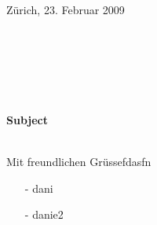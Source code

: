 \documentclass[a4paper,12pt]{letter}
\begin{document}
\renewcommand{\headrulewidth}{0pt}

\hspace{90mm}Zürich, 23. Februar 2009
\\\par\hspace{88mm}
\usebox{\areturn}\\
\hspace{90mm}\parbox[t][20mm]{50mm}{\hspace{90mm}\fromName \\ \fromStreet \\ \fromPlace \\ \fromTel } 
\vspace{20mm}
\par 
\textbf{Subject} \\\\
\vspace{10mm}
\par\hspace{90mm}Mit freundlichen Grüssefdasfn
\par\vspace{15mm}\hspace{90mm} \fromName
\begin{itemize}
\item [-] dani
\item [-] danie2 
\end{itemize}
\end{document}
